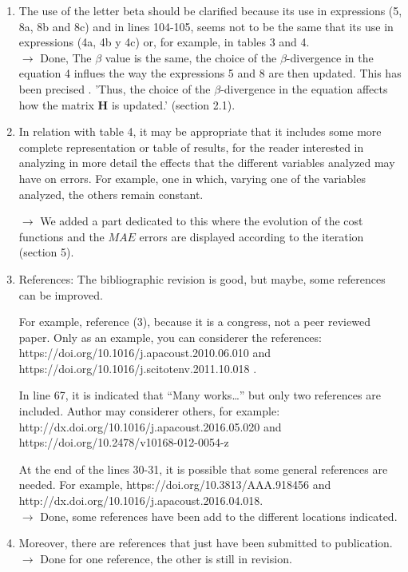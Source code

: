 \documentclass[10pt]{article}
\begin{document}
\begin{enumerate}
\item The use of the letter beta should be clarified because its use in expressions (5, 8a, 8b and 8c) and in lines 104-105, seems not to be the same that its use in expressions (4a, 4b y 4c) or, for example, in tables 3 and 4.\\
$\rightarrow$ Done, The $\beta$ value is the same, the choice of the $\beta$-divergence in the equation 4 influes the way the expressions 5 and 8 are then updated. This has been precised . 'Thus, the choice of the $\beta$-divergence in the equation affects how the matrix $\mathbf{H}$ is updated.' (section 2.1).

\item In relation with table 4, it may be appropriate that it includes some more complete representation or table of results, for the reader interested in analyzing in more detail the effects that the different variables analyzed may have on errors. For example, one in which, varying one of the variables analyzed, the others remain constant.

$\rightarrow$ We added a part dedicated to this where the evolution of the cost functions and the $MAE$ errors are displayed according to the iteration (section 5).

\item References: The bibliographic revision is good, but maybe, some references can be improved.

For example, reference (3), because it is a congress, not a peer reviewed paper. Only as an example, you can considerer the references: https://doi.org/10.1016/j.apacoust.2010.06.010 and https://doi.org/10.1016/j.scitotenv.2011.10.018 .

In line 67, it is indicated that “Many works…” but only two references are included. Author may considerer others, for example: 
http://dx.doi.org/10.1016/j.apacoust.2016.05.020 and https://doi.org/10.2478/v10168-012-0054-z

At the end of the lines 30-31, it is possible that some general references are needed. For example, 
https://doi.org/10.3813/AAA.918456 and http://dx.doi.org/10.1016/j.apacoust.2016.04.018.\\
$\rightarrow$ Done, some references have been add to the different locations indicated.


\item Moreover, there are references that just have been submitted to publication. \\
$\rightarrow$ Done for one reference, the other is still in revision.

\end{enumerate}
\end{document}
